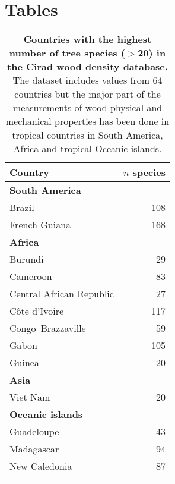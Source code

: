 \documentclass[a4paper, 12pt, leqno, dvipsnames]{article}\usepackage[]{graphicx}\usepackage[]{color}
\begin{document}
\section*{Tables}





\vfill
  \begin{longtable}{@{}lr@{}} 
    \caption{\textbf{Countries with the highest number of tree species ($>$20) in the
      Cirad wood density database.} The dataset includes values from 64 countries but the major
    part of the measurements of wood physical and mechanical properties has been done in tropical
    countries in South America, Africa and tropical Oceanic islands.}\label{tab:Countries}\\
    \toprule
    Country & $n$ species \\
    \midrule
    \textbf{South America} & ~ \\ 
    Brazil & 108 \\
    French Guiana & 168 \\
    \textbf{Africa} & ~ \\
    Burundi & 29 \\
    Cameroon & 83 \\
    Central African Republic & 27 \\
    Côte d'Ivoire & 117 \\
    Congo--Brazzaville & 59 \\
    Gabon & 105 \\
    Guinea & 20 \\
    \textbf{Asia} & ~ \\
    Viet Nam & 20 \\
    \textbf{Oceanic islands} & ~ \\
    Guadeloupe & 43 \\
    Madagascar & 94 \\
    New Caledonia & 87 \\
    \bottomrule\\
  \end{longtable}
\vfill
\end{document}
